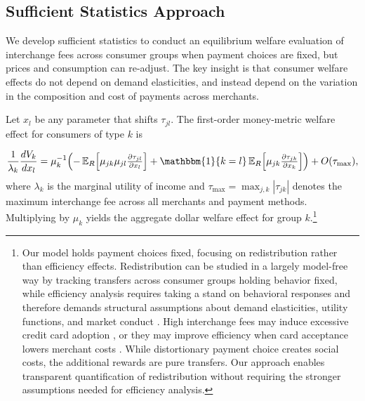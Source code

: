 \documentclass[main.tex]{subfiles}
\begin{document}
\subsection{Sufficient Statistics Approach}

We develop sufficient statistics to conduct an equilibrium welfare evaluation of interchange fees across consumer groups when payment choices are fixed, but prices and consumption can re-adjust.
The key insight is that consumer welfare effects do not depend on demand elasticities, and instead depend on the variation in the composition and cost of payments across merchants.

\begin{theorem}\label{thm:sufficient-stat}
Let $x_l$ be any parameter that shifts $\tau_{jl}$.
The first-order money-metric welfare effect for consumers of type $k$ is

\begin{equation}
\frac{1}{\lambda_k}\frac{dV_k}{dx_l}
= \mu_k^{-1}\!\left(
-\,\mathbb{E}_R\!\left[\mu_{jk}\mu_{jl}\tfrac{\partial\tau_{jl}}{\partial x_l}\right]
+ \mathbbm{1}\{k=l\}\,\mathbb{E}_R\!\left[\mu_{jk}\tfrac{\partial\tau_{jk}}{\partial x_k}\right]
\right) + O(\tau_{\max}),\label{eq:sufficient-stat-formula}
\end{equation}
where $\lambda_k$ is the marginal utility of income and $\tau_{\max} = \max_{j,k} |\tau_{jk}|$ denotes the maximum interchange fee across all merchants and payment methods.
Multiplying by $\mu_k$ yields the aggregate dollar welfare effect for group $k$.\footnote{Our model holds payment choices fixed, focusing on redistribution rather than efficiency effects.
Redistribution can be studied in a largely model-free way by tracking transfers across consumer groups holding behavior fixed, while efficiency analysis requires taking a stand on behavioral responses and therefore demands structural assumptions about demand elasticities, utility functions, and market conduct \citep{Wang2025}.
High interchange fees may induce excessive credit card adoption \citep{Wang2025}, or they may improve efficiency when card acceptance lowers merchant costs \citep{Li.etal2020}.
While distortionary payment choice creates social costs, the additional rewards are pure transfers.
Our approach enables transparent quantification of redistribution without requiring the stronger assumptions needed for efficiency analysis.}

\end{theorem}
\end{document}

